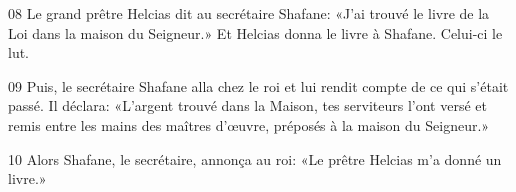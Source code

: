 
08 Le grand prêtre Helcias dit au secrétaire Shafane: «J’ai trouvé le livre de la Loi dans la maison du Seigneur.» Et Helcias donna le livre à Shafane. Celui-ci le lut.

09 Puis, le secrétaire Shafane alla chez le roi et lui rendit compte de ce qui s’était passé. Il déclara: «L’argent trouvé dans la Maison, tes serviteurs l’ont versé et remis entre les mains des maîtres d’œuvre, préposés à la maison du Seigneur.»

10 Alors Shafane, le secrétaire, annonça au roi: «Le prêtre Helcias m’a donné un livre.» 